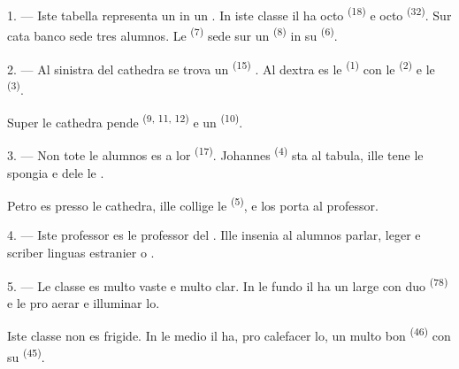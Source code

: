 \VUsaut{2.0mm}
\VUsaut{3.2mm}
\VUsaut{2.6mm}
\VUsaut{3.4mm}
\VUornamento{9pt}
\VUsaut{5.0mm}
\VUsaut{3.0mm}
\VUfilet{16mm}
\VUsaut{5.6mm}

\VUsaut{1.4mm}
\VUsaut{2.2mm}
\VUfilet{20mm}
\VUsaut{6.4mm}

\VUsaut{3.0mm}

1. --- Iste tabella representa un  in un . In iste
classe il ha octo  \textsuperscript{(18)} e octo 
\textsuperscript{(32)}. Sur cata banco sede tres alumnos. Le 
\textsuperscript{(7)} sede sur un  \textsuperscript{(8)} in su
 \textsuperscript{(6)}.

2. --- Al sinistra del cathedra se trova un 
\textsuperscript{(15)} . Al dextra es le 
\textsuperscript{(1)} con le  \textsuperscript{(2)} e le
 \textsuperscript{(3)}.

Super le cathedra pende  \textsuperscript{(9, 11, 12)} e
un  \textsuperscript{(10)}.

3. --- Non tote le alumnos es a lor  \textsuperscript{(17)}.
Johannes \textsuperscript{(4)} sta al tabula, ille tene le spongia e dele le
.

Petro es presso le cathedra, ille collige le 
\textsuperscript{(5)}, e los porta al professor.

4. --- Iste professor es le professor del . Ille insenia
al alumnos parlar, leger e scriber linguas estranier  o .

5. --- Le classe es multo vaste e multo clar. In le fundo il ha un large
 con duo  \textsuperscript{(78)} e le
 pro aerar e illuminar lo.

Iste classe non es frigide. In le medio il ha, pro calefacer lo, un multo bon
 \textsuperscript{(46)} con su 
\textsuperscript{(45)}.

